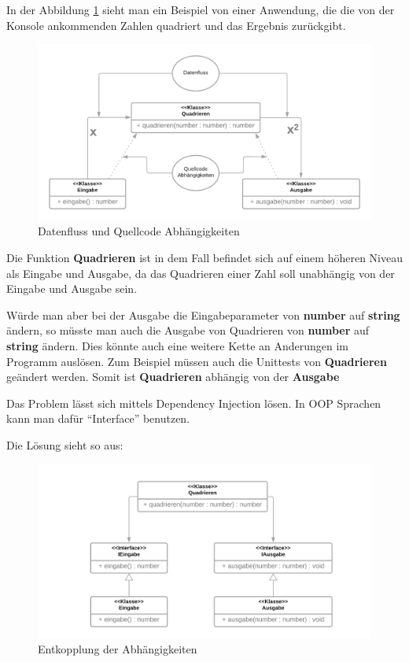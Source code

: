 In der Abbildung \ref{fig:dateflowVScodedep} sieht man ein Beispiel von einer Anwendung, die die von der Konsole ankommenden Zahlen quadriert und das Ergebnis zurückgibt.
                
\begin{figure}[H]
    \centering
    \includegraphics[width=1\textwidth]{./images/DepInj_1.png}
    \caption{Datenfluss und Quellcode Abhängigkeiten}
    \label{fig:dateflowVScodedep}
\end{figure}

Die Funktion \textbf{Quadrieren} ist in dem Fall befindet sich auf einem höheren Niveau als Eingabe und Ausgabe, 
da das Quadrieren einer Zahl soll unabhängig von der Eingabe und Ausgabe sein.

Würde man aber bei der Ausgabe die Eingabeparameter von \textbf{number} auf \textbf{string} ändern, 
so müsste man auch die Ausgabe von Quadrieren von \textbf{number} auf \textbf{string} ändern.
Dies könnte auch eine weitere Kette an Anderungen im Programm auslösen. 
Zum Beispiel müssen auch die Unittests von \textbf{Quadrieren} geändert werden.
Somit ist \textbf{Quadrieren} abhängig von der \textbf{Ausgabe}

Das Problem lässt sich mittels Dependency Injection lösen.
In OOP Sprachen kann man dafür ``Interface'' benutzen.

Die Lösung sieht so aus: 
\begin{figure}[H]
    \centering
    \includegraphics[width=1\textwidth]{./images/DepInj_2.png}
    \caption{Entkopplung der Abhängigkeiten}
    \label{fig:flow around cylinder}
\end{figure}


